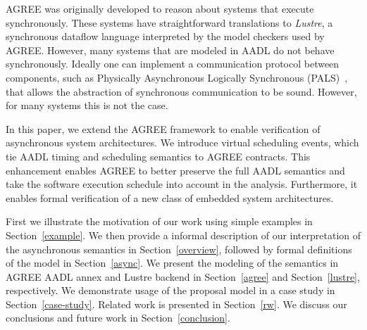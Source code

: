 AGREE was originally developed to reason about systems that execute synchronously. These systems have straightforward translations to \emph{Lustre}, a synchronous dataflow language interpreted by the model checkers used by AGREE. However, many systems that are modeled in AADL do not behave synchronously. Ideally one can implement a communication protocol between components, such as Physically Asynchronous Logically Synchronous (PALS)~\cite{pals}, that allows the abstraction of synchronous communication to be sound. However, for many systems this is not the case.

In this paper, we extend the AGREE framework to enable verification of asynchronous system architectures. We introduce virtual scheduling events, which tie AADL timing and scheduling semantics to AGREE contracts. This enhancement enables AGREE to better preserve the full AADL semantics and take the software execution schedule into account in the analysis.  Furthermore, it enables formal verification of a new class of embedded system architectures. 

First we illustrate the motivation of our work using simple examples in Section~\ref{example}. We then provide a informal description of our interpretation of the asynchronous semantics in Section~\ref{overview}, followed by formal definitions of the model in Section~\ref{async}. We present the modeling of the semantics in AGREE AADL annex and Lustre backend in Section~\ref{agree} and Section~\ref{lustre}, respectively. We demonstrate usage of the proposal model in a case study in Section~\ref{case-study}. Related work is presented in Section~\ref{rw}.  We discuss our conclusions and future work in Section~\ref{conclusion}.  